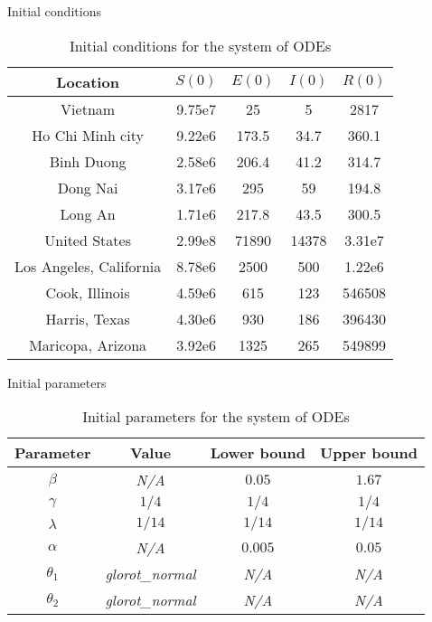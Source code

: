 \begin{frame}{Initial conditions}
    \begin{table}[h]
        \centering
        \begin{tabular}{| c | c | c | c | c |}
            Location & $S(0)$ & $E(0)$ & $I(0)$ & $R(0)$ \\
            \hline\hline
            Vietnam & 9.75e7 & 25 & 5 & 2817 \\
            \hline
            Ho Chi Minh city & 9.22e6 & 173.5 & 34.7 & 360.1 \\
            \hline
            Binh Duong & 2.58e6 & 206.4 & 41.2 & 314.7 \\
            \hline
            Dong Nai & 3.17e6 & 295 & 59 & 194.8 \\
            \hline
            Long An & 1.71e6 & 217.8 & 43.5 & 300.5 \\
            \hline
            United States & 2.99e8 & 71890 & 14378 & 3.31e7 \\
            \hline
            Los Angeles, California & 8.78e6 & 2500 & 500 & 1.22e6 \\
            \hline
            Cook, Illinois & 4.59e6 & 615 & 123 & 546508 \\
            \hline
            Harris, Texas & 4.30e6 & 930 & 186 & 396430 \\
            \hline
            Maricopa, Arizona & 3.92e6 & 1325 & 265 & 549899 \\
            \hline
        \end{tabular}
        \caption{Initial conditions for the system of \glspl{ODE}}
        \label{tab:ude-model-initial-conditions}
    \end{table}
\end{frame}

\begin{frame}{Initial parameters}
    \begin{table}[h]
        \centering
        \begin{tabular}{| c | c | c | c |}
            Parameter & Value & Lower bound & Upper bound \\
            \hline\hline
            $\beta$ & \textit{N/A} & $0.05$ & $1.67$ \\
            \hline
            $\gamma$ & $1/4$ & $1/4$ & $1/4$ \\
            \hline
            $\lambda$ & $1/14$ & $1/14$ & $1/14$ \\
            \hline
            $\alpha$ & \textit{N/A} & $0.005$ & $0.05$ \\
            \hline
            $\theta_1$ & \textit{glorot\_normal} & \textit{N/A} & \textit{N/A} \\
            \hline
            $\theta_2$ & \textit{glorot\_normal} & \textit{N/A} & \textit{N/A} \\
            \hline
        \end{tabular}
        \caption{Initial parameters for the system of \glspl{ODE}}
        \label{tab:ude-model-initial-parameters}
    \end{table}
\end{frame}

